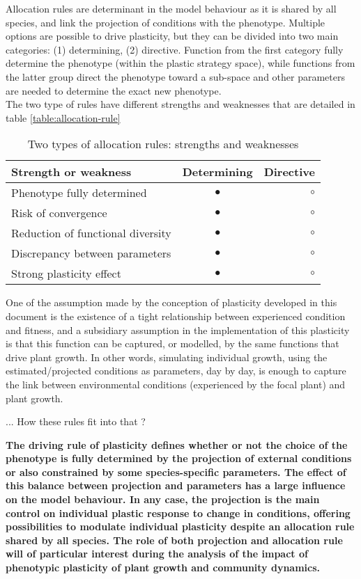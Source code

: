 Allocation rules are determinant in the model behaviour as it is shared by all species, and link the projection of conditions with the phenotype. Multiple options are possible to drive plasticity, but they can be divided into two main categories: (1) determining, (2) directive. Function from the first category fully determine the phenotype (within the plastic strategy space), while functions from the latter group direct the phenotype toward a sub-space and other parameters are needed to determine the exact new phenotype.\\
The two type of rules have different strengths and weaknesses that are detailed in table \ref{table:allocation-rule}

\begin{table}
\caption{Two types of allocation rules: strengths and weaknesses} 
\label{table:state_var_plant}
\begin{center}%
\begin{tabular}{l c r}
Strength or weakness & Determining & Directive \\ 
\hline 
Phenotype fully determined & \textcolor{myGreen}{$\bullet$} & $\circ$ \\
Risk of convergence & $\bullet$ &  $\circ$ \\
Reduction of functional diversity & $\bullet$ &  $\circ$\\
Discrepancy between parameters & $\bullet$ &  $\circ$\\
Strong plasticity effect & \textcolor{myGreen}{$\bullet$} & $\circ$
\end{tabular} 
\end{center}
\vspace*{0.5cm}
\end{table}


One of the assumption made by the conception of plasticity developed in this document is the existence of a tight relationship between experienced condition and fitness, and a subsidiary assumption in the implementation of this plasticity is that this function can be captured, or modelled, by the same functions that drive plant growth. In other words, simulating individual growth, using the estimated/projected conditions as parameters, day by day, is enough to capture the link between environmental conditions (experienced by the focal plant) and plant growth.


... How these rules fit into that ?

\textbf{
The driving rule of plasticity defines whether or not the choice of the phenotype is fully determined by the projection of external conditions or also constrained by some species-specific parameters. The effect of this balance between projection and parameters has a large influence on the model behaviour. In any case, the projection is the main control on individual plastic response to change in conditions, offering possibilities to modulate individual plasticity despite an allocation rule shared by all species. The role of both projection and allocation rule will of particular interest during the analysis of the impact of phenotypic plasticity of plant growth and community dynamics.}

